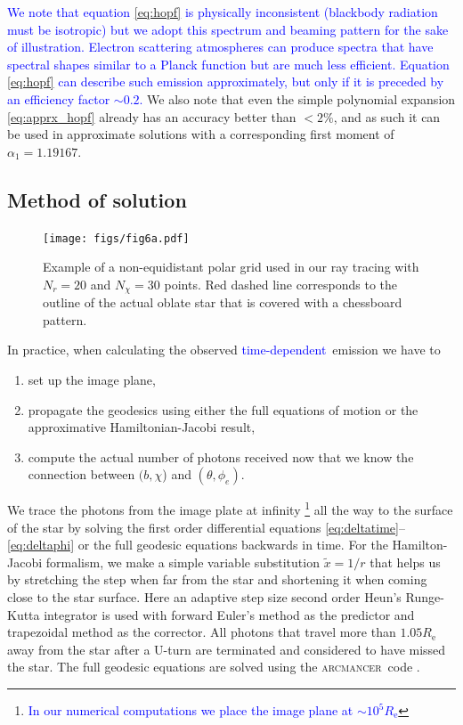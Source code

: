 \documentclass{aa}
\newcommand{\refe}[1]{\textcolor{blue}{{#1}}}
\begin{document}
\refe{We note that equation \eqref{eq:hopf} is physically inconsistent (blackbody radiation must be isotropic) but we adopt this spectrum and beaming pattern for the sake of illustration. 
Electron scattering atmospheres can produce spectra that have spectral shapes similar to a Planck function but are much less efficient. 
Equation \eqref{eq:hopf} can describe such emission approximately, but only if it is preceded by an efficiency factor $\sim 0.2$.
}
We also note that even the simple polynomial expansion \eqref{eq:apprx_hopf} already has an accuracy better than $<2\%$, and as such it can be used in approximate solutions with a corresponding first moment of $\alpha_1 = 1.19167$.




\subsection{Method of solution}\label{sect:num_methods}


\begin{figure}
\centering
\texttt{[image: figs/fig6a.pdf]}
\caption{\label{fig:grid}
Example of a non-equidistant polar grid used in our ray tracing with $N_r = 20$ and $N_{\chi} = 30$ points.
    Red dashed line corresponds to the outline of the actual oblate star that is covered with a chessboard pattern.
}
\end{figure}

In practice, when calculating the observed \refe{time-dependent} emission we have to 
\begin{enumerate}
    \item set up the image plane, 
    \item propagate the geodesics using either the full equations of motion or the approximative Hamiltonian-Jacobi result, 
    \item compute the actual number of photons received now that we know the connection between $(b,\chi$) and $(\theta, \phi_e)$.
\end{enumerate}

We trace the photons from the image plate at infinity%
\footnote{\refe{ In our numerical computations we place the image plane at $\sim 10^5 R_{\mathrm{e}}$}}
all the way to the surface of the star by solving the first order
differential equations \eqref{eq:deltatime}--\eqref{eq:deltaphi} or the full geodesic equations backwards in time.  
For the Hamilton-Jacobi formalism, we make a simple variable substitution $\tilde{x} = 1/r$
 that helps us by stretching the step when
far from the star and shortening it when coming close to the star
surface.  Here an adaptive step size second order Heun's Runge-Kutta
integrator is used with forward Euler's method as
the predictor and trapezoidal method as the corrector.  
All photons that travel more than $1.05 R_{\mathrm{e}}$ away from the star after a U-turn are
terminated and considered to have missed the star.
The full geodesic equations are solved using the \textsc{arcmancer} code \citep[see][and the related equations therein]{PRJ16}.
\end{document}
